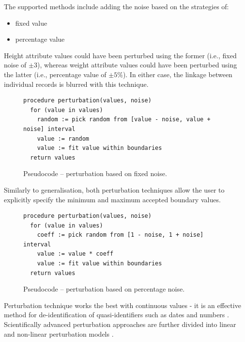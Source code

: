 \documentclass[a4paper,twoside,12pt]{book}
\begin{document}
The supported methods include adding the noise based on the strategies of:
\begin{itemize}
\item fixed value
\item percentage value
\end{itemize}

Height attribute values could have been perturbed using the former (i.e., fixed noise of $\pm 3$), whereas weight attribute values could have been perturbed using the latter (i.e., percentage value of $\pm 5 \%$). In either case, the linkage between individual records is blurred with this technique. 

\begin{figure}[h]
\begin{verbatim}
procedure perturbation(values, noise)
  for (value in values)
    random := pick random from [value - noise, value + noise] interval
    value := random
    value := fit value within boundaries
  return values
\end{verbatim}
\caption{Pseudocode – perturbation based on fixed noise.}
\label{fig:code:perturbation_fixed}
\end{figure}

Similarly to generalisation, both perturbation techniques allow the user to explicitly specify the minimum and maximum accepted boundary values.

\begin{figure}[h]
\begin{verbatim}
procedure perturbation(values, noise)
  for (value in values)
    coeff := pick random from [1 - noise, 1 + noise] interval
    value := value * coeff
    value := fit value within boundaries
  return values
\end{verbatim}
\caption{Pseudocode – perturbation based on percentage noise.}
\label{fig:code:perturbation_percentage}
\end{figure}

Perturbation technique works the best with continuous values - it is an effective method for de-identification of quasi-identifiers such as dates and numbers \cite{bib:anonymisation_techniques_singapore}. Scientifically advanced perturbation approaches are further divided into linear and non-linear perturbation models \cite{bib:perturbation_methods}.
\end{document}
